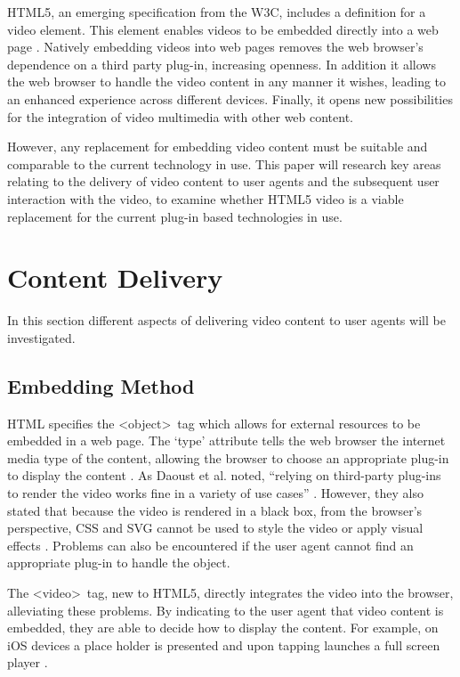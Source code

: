 \documentclass[journal]{IEEEtran}
\begin{document}
HTML5, an emerging specification from the W3C, includes a definition for a video element. This element enables videos to be embedded directly into a web page \cite{standard:html5}. Natively embedding videos into web pages removes the web browser's dependence on a third party plug-in, increasing openness. In addition it allows the web browser to handle the video content in any manner it wishes, leading to an enhanced experience across different devices. Finally, it opens new possibilities for the integration of video multimedia with other web content.

However, any replacement for embedding video content must be suitable and comparable to the current technology in use. This paper will research key areas relating to the delivery of video content to user agents and the subsequent user interaction with the video, to examine whether HTML5 video is a viable replacement for the current plug-in based technologies in use.

\section{Content Delivery}
In this section different aspects of delivering video content to user agents will be investigated.

\subsection{Embedding Method} 
HTML specifies the \textless object\textgreater~tag which allows for external resources to be embedded in a web page. The `type' attribute tells the web browser the internet media type of the content, allowing the browser to choose an appropriate plug-in to display the content \cite{standard:html5}. As Daoust et al. noted, ``relying on third-party plug-ins to render the video works fine in a variety of use cases'' \cite{article:towardsVideoOnTheWebWithHTML5}. However, they also stated that because the video is rendered in a black box, from the browser's perspective, CSS and SVG cannot be used to style the video or apply visual effects \cite{article:towardsVideoOnTheWebWithHTML5}. Problems can also be encountered if the user agent cannot find an appropriate plug-in to handle the object.

The \textless video\textgreater~tag, new to HTML5, directly integrates the video into the browser, alleviating these problems. By indicating to the user agent that video content is embedded, they are able to decide how to display the content. For example, on iOS devices a place holder is presented and upon tapping launches a full screen player \cite{website:safariHTML5}.
\end{document}
